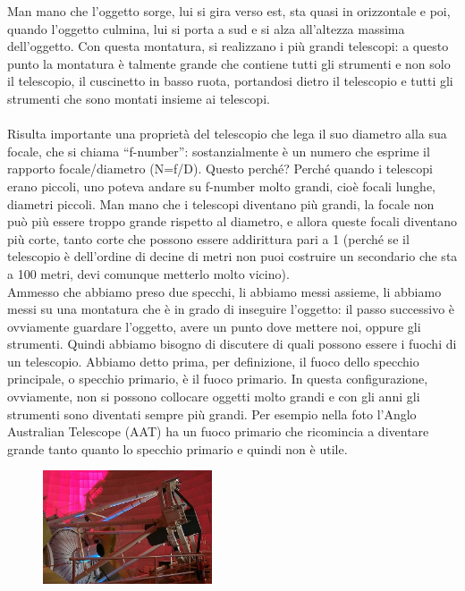 \documentclass[a4paper,11pt]{article}
\begin{document}
Man mano che l’oggetto sorge, lui si gira verso est, sta quasi in orizzontale e poi, quando l’oggetto culmina, lui si porta a sud e si alza all’altezza massima dell'oggetto. Con questa montatura, si realizzano i più grandi telescopi: a questo punto la montatura è talmente grande che contiene tutti gli strumenti e non solo il telescopio, il cuscinetto in basso ruota, portandosi dietro il telescopio e tutti gli strumenti che sono montati insieme ai telescopi.\\\\


Risulta importante una proprietà del telescopio che lega il suo diametro alla sua focale, che si chiama “f-number”: sostanzialmente è un numero che esprime il rapporto focale/diametro (N=f/D). Questo perché? Perché quando i telescopi erano piccoli, uno poteva andare su f-number molto grandi, cioè focali lunghe, diametri piccoli. Man mano che i telescopi diventano più grandi, la focale non può più essere troppo grande rispetto al diametro, e allora queste focali diventano più corte, tanto corte che possono essere addirittura pari a 1 (perché se il telescopio è dell’ordine di decine di metri non puoi costruire un secondario che sta a 100 metri, devi comunque metterlo molto vicino).\\
Ammesso che abbiamo preso due specchi, li abbiamo messi assieme, li abbiamo messi su una montatura che è in grado di inseguire l’oggetto: il passo successivo è ovviamente guardare l’oggetto, avere un punto dove mettere noi, oppure gli strumenti. Quindi abbiamo bisogno di discutere di quali possono essere i fuochi di un telescopio. Abbiamo detto prima, per definizione, il fuoco dello specchio principale, o specchio primario, è il fuoco primario. In questa configurazione, ovviamente, non si possono collocare oggetti molto grandi e con gli anni gli strumenti sono diventati sempre più grandi. Per esempio nella foto l’Anglo Australian Telescope (AAT) ha un fuoco primario che ricomincia a diventare grande tanto quanto lo specchio primario e quindi non è utile. 

\begin{figure}[h!!]
        \centering
        \includegraphics[width=5cm]{12.jpg}
        \label{}
    \end{figure}
\end{document}
